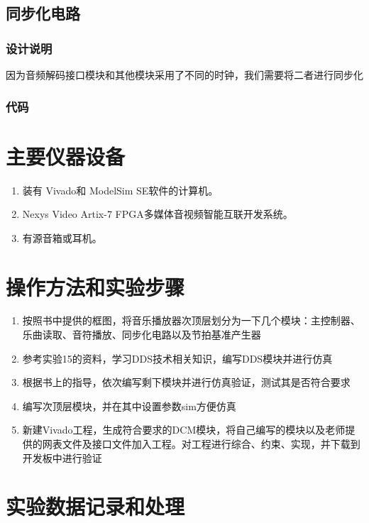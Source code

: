 \documentclass{ctexart}
\begin{document}
    \subsection{同步化电路}
        \subsubsection{设计说明}
        因为音频解码接口模块和其他模块采用了不同的时钟，我们需要将二者进行同步化
        \subsubsection{代码}
        

\section{主要仪器设备}
\begin{enumerate}
    \item 装有 Vivado和 ModelSim SE软件的计算机。
    \item Nexys Video Artix-7 FPGA多媒体音视频智能互联开发系统。
    \item 有源音箱或耳机。
\end{enumerate}

\section{操作方法和实验步骤}
\begin{enumerate}
    \item 按照书中提供的框图，将音乐播放器次顶层划分为一下几个模块：主控制器、乐曲读取、音符播放、同步化电路以及节拍基准产生器
    \item 参考实验15的资料，学习DDS技术相关知识，编写DDS模块并进行仿真
    \item 根据书上的指导，依次编写剩下模块并进行仿真验证，测试其是否符合要求
    \item 编写次顶层模块，并在其中设置参数sim方便仿真
    \item 新建Vivado工程，生成符合要求的DCM模块，将自己编写的模块以及老师提供的网表文件及接口文件加入工程。对工程进行综合、约束、实现，并下载到开发板中进行验证
\end{enumerate}

\section{实验数据记录和处理}
\end{document}
